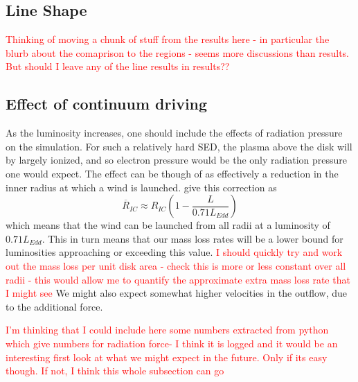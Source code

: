 \documentclass[a4paper,fleqn,usenatbib]{mnras}
\begin{document}
\subsection{Line Shape}
\textcolor{red}{Thinking of moving a chunk of stuff from the results here - in particular the blurb 
about the comaprison to the regions - seems more discussions than results. But should I leave
any of the line results in results??}


\subsection{Effect of continuum driving}

As the luminosity increases, one should include the effects
of radiation pressure on the simulation. For such a relatively hard SED, 
the plasma above the disk will by largely ionized, and so electron
pressure would be the only radiation pressure one would expect. The 
effect can be though of as effectively a reduction in the inner radius
at which a wind is launched. \cite{2018MNRAS.473..838D} give this 
correction as
\begin{equation}
\overline{R}_{IC}\approx R_{IC}\left(1-\frac{L}{0.71L_{Edd}}\right)
\end{equation}
which means that the wind can be launched from all radii at a luminosity
of $0.71 L_{Edd}$. This in turn means that our mass loss rates will be a lower 
bound for luminosities approaching or exceeding this value. \textcolor{red}{I should 
quickly try and work out the mass loss per unit disk area - check this is more or less
constant over all radii - this would allow me to quantify the approximate extra mass loss
rate that I might see} We might also 
expect somewhat higher velocities in the outflow, due to the additional force.

\textcolor{red}{I'm thinking that I could include here some numbers extracted from python 
which give numbers for radiation force- I think it is logged and it would be an 
interesting first look at what we might expect in the future. Only if its easy though.
If not, I think this whole subsection can go}

\end{document}

